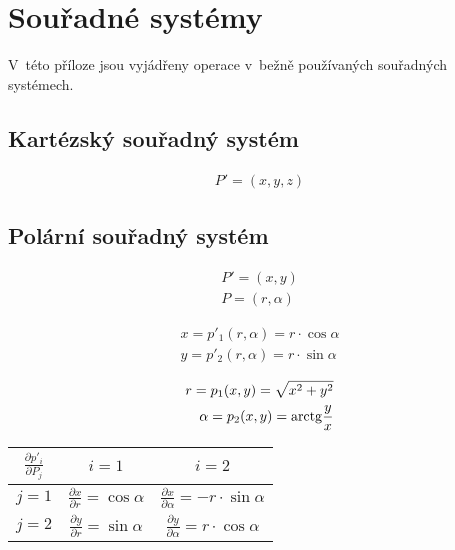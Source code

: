 \chapter{Souřadné systémy}

V~této příloze jsou vyjádřeny operace v~bežně používaných souřadných systémech.

\section{Kartézský souřadný systém}

\begin{equation}
\begin{split}
P' = (x, y, z)
\end{split}
\end{equation}

\section{Polární souřadný systém}

\begin{equation}
\begin{split}
P' = (x, y) \\
P = (r, \alpha)
\end{split}
\end{equation}

\begin{equation}
\begin{split}
x = p'_1(r, \alpha) = r \cdot \cos \alpha \\
y = p'_2(r, \alpha) = r \cdot \sin \alpha
\end{split}
\end{equation}

\begin{equation}
\begin{split}
r = p_1(x, y) = \sqrt{x^2 + y^2} \\
\alpha = p_2(x, y) = \mathrm{arctg} \frac{y}{x}
\end{split}
\end{equation}

\begin{tabular}{| c || c | c |}
\hline
\(\frac{\partial p'_i}{\partial P_j}\) & \(i=1\) & \(i=2\) \\
\hline
\hline
\(j=1\) & \(\frac{\partial x}{\partial r} = \cos \alpha\) & \(\frac{\partial x}{\partial \alpha} = -r \cdot \sin \alpha\) \\
\hline
\(j=2\) & \(\frac{\partial y}{\partial r} = \sin \alpha\) & \(\frac{\partial y}{\partial \alpha} = r \cdot \cos \alpha\) \\
\hline
\end{tabular}

